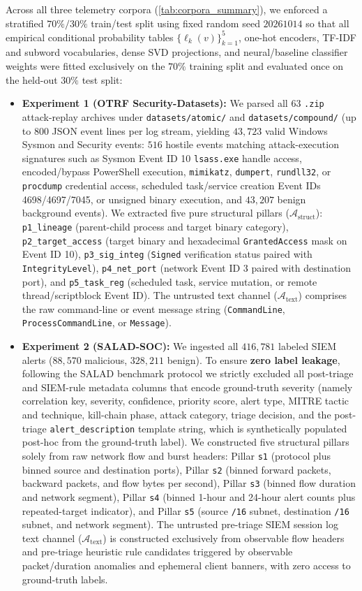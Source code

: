 \documentclass[11pt,a4paper]{article}
\let\oldtexttt\texttt
\renewcommand{\texttt}[1]{\textnormal{\oldtexttt{#1}}}
\begin{document}
Across all three telemetry corpora (\cref{tab:corpora_summary}), we enforced a stratified $70\% / 30\%$ train/test split using fixed random seed $20261014$ so that all empirical conditional probability tables $\{\ell_k(v)\}_{k=1}^5$, one-hot encoders, TF-IDF and subword vocabularies, dense SVD projections, and neural/baseline classifier weights were fitted exclusively on the $70\%$ training split and evaluated once on the held-out $30\%$ test split:
\begin{itemize}
  \item \textbf{Experiment 1 (OTRF Security-Datasets):} We parsed all 63 \texttt{.zip} attack-replay archives under \texttt{datasets/atomic/} and \texttt{datasets/compound/} (up to 800 JSON event lines per log stream, yielding $43,723$ valid Windows Sysmon and Security events: $516$ hostile events matching attack-execution signatures such as Sysmon Event ID 10 \texttt{lsass.exe} handle access, encoded/bypass PowerShell execution, \texttt{mimikatz}, \texttt{dumpert}, \texttt{rundll32}, or \texttt{procdump} credential access, scheduled task/service creation Event IDs 4698/4697/7045, or unsigned binary execution, and $43,207$ benign background events). We extracted five pure structural pillars ($\mathcal{A}_{\text{struct}}$): \texttt{p1\_lineage} (parent-child process and target binary category), \texttt{p2\_target\_access} (target binary and hexadecimal \texttt{GrantedAccess} mask on Event ID 10), \texttt{p3\_sig\_integ} (\texttt{Signed} verification status paired with \texttt{IntegrityLevel}), \texttt{p4\_net\_port} (network Event ID 3 paired with destination port), and \texttt{p5\_task\_reg} (scheduled task, service mutation, or remote thread/scriptblock Event ID). The untrusted text channel ($\mathcal{A}_{\text{text}}$) comprises the raw command-line or event message string (\texttt{CommandLine}, \texttt{ProcessCommandLine}, or \texttt{Message}).
  \item \textbf{Experiment 2 (SALAD-SOC):} We ingested all $416,781$ labeled SIEM alerts ($88,570$ malicious, $328,211$ benign). To ensure \textbf{zero label leakage}, following the SALAD benchmark protocol we strictly excluded all post-triage and SIEM-rule metadata columns that encode ground-truth severity (namely correlation key, severity, confidence, priority score, alert type, MITRE tactic and technique, kill-chain phase, attack category, triage decision, and the post-triage \texttt{alert\_description} template string, which is synthetically populated post-hoc from the ground-truth label). We constructed five structural pillars solely from raw network flow and burst headers: Pillar \texttt{s1} (protocol plus binned source and destination ports), Pillar \texttt{s2} (binned forward packets, backward packets, and flow bytes per second), Pillar \texttt{s3} (binned flow duration and network segment), Pillar \texttt{s4} (binned 1-hour and 24-hour alert counts plus repeated-target indicator), and Pillar \texttt{s5} (source \texttt{/16} subnet, destination \texttt{/16} subnet, and network segment). The untrusted pre-triage SIEM session log text channel ($\mathcal{A}_{\text{text}}$) is constructed exclusively from observable flow headers and pre-triage heuristic rule candidates triggered by observable packet/duration anomalies and ephemeral client banners, with zero access to ground-truth labels.

\end{itemize}
\end{document}
